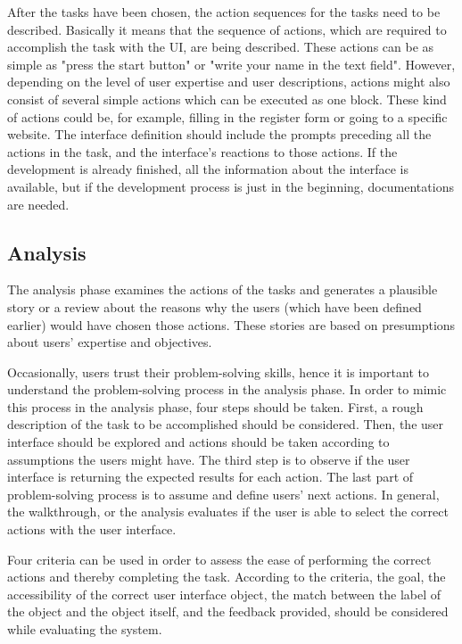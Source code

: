 \documentclass[12pt,a4paper,oneside,pdftex]{report}
\begin{document}
After the tasks have been chosen, the action sequences for the tasks need to be described. Basically it means that the sequence of actions, which are required to accomplish the task with the UI, are being described. These actions can be as simple as "press the start button" or "write your name in the text field". However, depending on the level of user expertise and user descriptions, actions might also consist of several simple actions which can be executed as one block. These kind of actions could be, for example, filling in the register form or going to a specific website. The interface definition should include the prompts preceding all the actions in the task, and the interface's reactions to those actions. If the development is already finished, all the information about the interface is available, but if the development process is just in the beginning, documentations are needed. \citep{RefWorks:26}

\subsection{Analysis}

The analysis phase examines the actions of the tasks and generates a plausible story or a review about the reasons why the users (which have been defined earlier) would have chosen those actions. These stories are based on presumptions about users' expertise and objectives. \citep{RefWorks:26}

Occasionally, users trust their problem-solving skills, hence it is important to understand the problem-solving process in the analysis phase. In order to mimic this process in the analysis phase, four steps should be taken. First, a rough description of the task to be accomplished should be considered. Then, the user interface should be explored and actions should be taken according to assumptions the users might have. The third step is to observe if the user interface is returning the expected results for each action. The last part of problem-solving process is to assume and define users' next actions.\citep{RefWorks:26} In general, the walkthrough, or the analysis evaluates if the user is able to select the correct actions with the user interface.

Four criteria can be used in order to assess the ease of performing the correct actions and thereby completing the task. According to the criteria, the goal, the accessibility of the correct user interface object, the match between the label of the object and the object itself, and the feedback provided, should be considered while evaluating the system. \citep{RefWorks:34}
\end{document}
